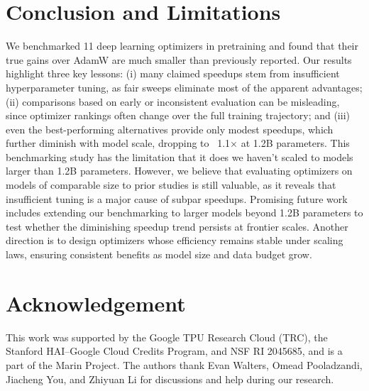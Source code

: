 \section{Conclusion and Limitations}





We benchmarked 11 deep learning optimizers in pretraining and found that their true gains over AdamW are much smaller than previously reported. Our results highlight three key lessons: (i) many claimed speedups stem from insufficient hyperparameter tuning, as fair sweeps eliminate most of the apparent advantages; (ii) comparisons based on early or inconsistent evaluation can be misleading, since optimizer rankings often change over the full training trajectory; and (iii) even the best-performing alternatives provide only modest speedups, which further diminish with model scale, dropping to ~1.1× at 1.2B parameters. This benchmarking study has the limitation that it does we haven't scaled to models larger than 1.2B parameters. However, we believe that evaluating optimizers on models of comparable size to prior studies is still valuable, as it reveals that insufficient tuning is a major cause of subpar speedups. Promising future work includes extending our benchmarking to larger models beyond 1.2B parameters to test whether the diminishing speedup trend persists at frontier scales. Another direction is to design optimizers whose efficiency remains stable under scaling laws, ensuring consistent benefits as model size and data budget grow.


\section*{Acknowledgement}

This work was supported by the Google TPU Research Cloud (TRC), the Stanford HAI–Google Cloud Credits Program, and  NSF RI 2045685, and is a part of the Marin Project. The authors thank Evan Walters, Omead Pooladzandi, Jiacheng You, and Zhiyuan Li for discussions and help during our research.